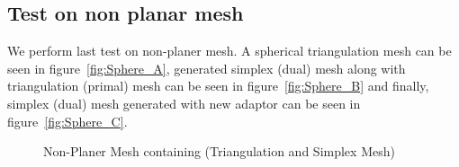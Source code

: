 \documentclass{InsightArticle}
\begin{document}
\subsection{Test on non planar mesh}
We perform last test on non-planer mesh. A spherical triangulation mesh can be seen in figure~\ref{fig:Sphere_A}, generated simplex (dual) mesh along with triangulation (primal) mesh can be seen in figure~\ref{fig:Sphere_B} and finally, simplex (dual) mesh generated with new adaptor can be seen in figure~\ref{fig:Sphere_C}. \\
\begin{figure}
	\centering
	\caption{Non-Planer Mesh containing (Triangulation and  Simplex Mesh)}
\label{fig:nonplanerTriangulationToSimplexMesh}
\end{figure}
\end{document}
